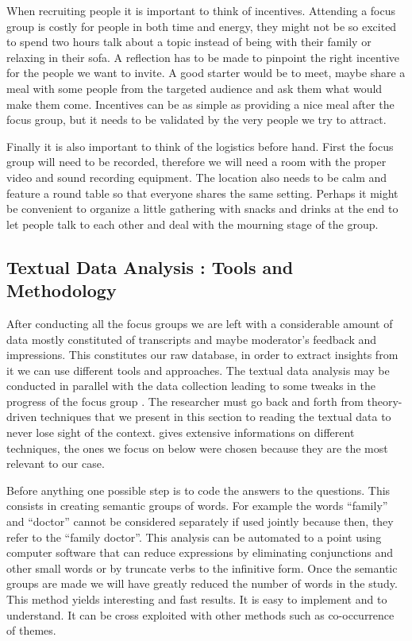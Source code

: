 \documentclass[10pt]{report}
\begin{document}
When recruiting people it is important to think of incentives. Attending a focus group is costly for people in both time and energy, they might not be so excited to spend two hours talk about a topic instead of being with their family or relaxing in their sofa. A reflection has to be made to pinpoint the right incentive for the people we want to invite. A good starter would be to meet, maybe share a meal with some people from the targeted audience and ask them what would make them come. Incentives can be as simple as providing a nice meal after the focus group, but it needs to be validated by the very people we try to attract.

Finally it is also important to think of the logistics before hand. First the focus group will need to be recorded, therefore we will need a room with the proper video and sound recording equipment. The location also needs to be calm and feature a round table so that everyone shares the same setting. 
Perhaps it might be convenient to organize a little gathering with snacks and drinks at the end to let people talk to each other and deal with the mourning stage of the group.

\subsection{Textual Data Analysis : Tools and Methodology}

After conducting all the focus groups we are left with a considerable amount of data mostly constituted of transcripts and maybe moderator's feedback and impressions. This constitutes our raw database, in order to extract insights from it we can use different tools and approaches. The textual data analysis may be conducted in parallel with the data collection leading to some tweaks in the progress of the focus group \autocite{pope2000}. The researcher must go back and forth from theory-driven techniques that we present in this section to reading the textual data to never lose sight of the context. \autocite{pope2000} gives extensive informations on different techniques, the ones we focus on below were chosen because they are the most relevant to our case.

Before anything one possible step is to code the answers to the questions. This consists in creating semantic groups of words. For example the words \enquote{family} and \enquote{doctor} cannot be considered separately if used jointly because then, they refer to the \enquote{family doctor}. This analysis can be automated to a point using computer software that can reduce expressions by eliminating conjunctions and other small words or by truncate verbs to the infinitive form. Once the semantic groups are made we will have greatly reduced the number of words in the study. This method yields interesting and fast results. It is easy to implement and to understand. It can be cross exploited with other methods such as co-occurrence of themes.
\end{document}
